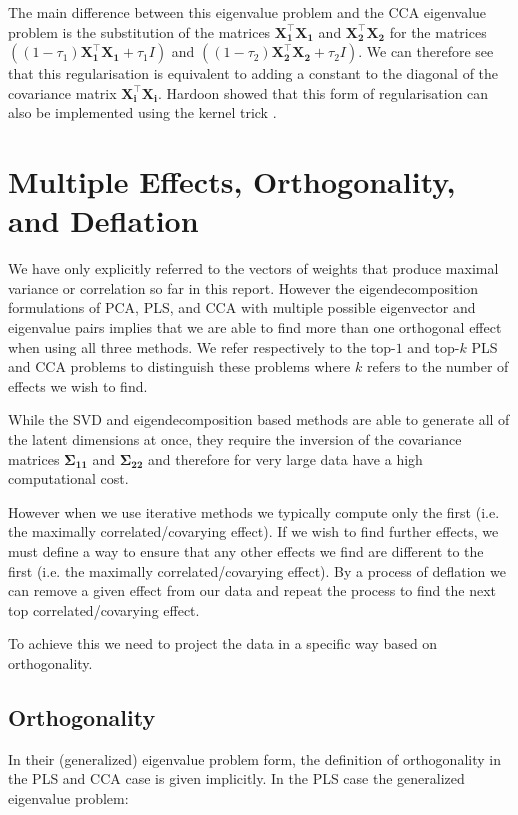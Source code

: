 The main difference between this eigenvalue problem and the CCA eigenvalue problem is the substitution of the matrices $\mathbf{X_1^{\top}X_1}$ and $\mathbf{X_2^{\top}X_2}$ for the matrices $((1-\tau_1)\mathbf{X_1^{\top}X_1}+\tau_1I)$ and $((1-\tau_2)\mathbf{X_2^{\top}X_2}+\tau_2I)$. We can therefore see that this regularisation is equivalent to adding a constant to the diagonal of the covariance matrix $\mathbf{X_i^{\top}X_i}$. Hardoon showed that this form of regularisation can also be implemented using the kernel trick \cite{hardoon2004canonical}.

\section{Multiple Effects, Orthogonality, and Deflation}\label{sec:orthogonality}

We have only explicitly referred to the vectors of weights that produce maximal variance or correlation so far in this report. However the eigendecomposition formulations of PCA, PLS, and CCA with multiple possible eigenvector and eigenvalue pairs implies that we are able to find more than one orthogonal effect when using all three methods. We refer respectively to the top-$1$ and top-$k$ PLS and CCA problems to distinguish these problems where $k$ refers to the number of effects we wish to find.

While the SVD and eigendecomposition based methods are able to generate all of the latent dimensions at once, they require the inversion of the covariance matrices $\mathbf{\Sigma_{11}}$ and $\mathbf{\Sigma_{22}}$ and therefore for very large data have a high computational cost.

However when we use iterative methods we typically compute only the first (i.e. the maximally correlated/covarying effect). If we wish to find further effects, we must define a way to ensure that any other effects we find are different to the first (i.e. the maximally correlated/covarying effect). By a process of deflation we can remove a given effect from our data and repeat the process to find the next top correlated/covarying effect.

To achieve this we need to project the data in a specific way based on orthogonality.

\subsection{Orthogonality}

In their (generalized) eigenvalue problem form, the definition of orthogonality in the PLS and CCA case is given implicitly. In the PLS case the generalized eigenvalue problem:

